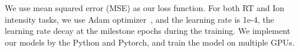 We use mean squared
error (MSE) as our loss function. For both RT and Ion intensity tasks, we use Adam optimizer~\cite{kingma2017adam}, and the learning rate is 1e-4, the learning rate decay at the milestone epochs during the training. We implement our models by the Python and Pytorch, and train the model on multiple GPUs. 


